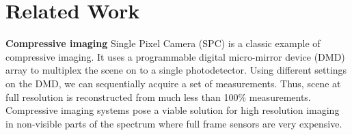 \documentclass[journal,twoside]{IEEEtran}
\begin{document}
\section{Related Work}





\textbf{Compressive imaging} Single Pixel Camera (SPC) \cite{duarte2008single} is a classic example of compressive imaging. It uses a programmable digital micro-mirror device (DMD) array to multiplex the scene on to a single photodetector. Using different settings on the DMD, we can sequentially acquire a set of measurements. Thus, scene at full resolution is reconstructed from much less than 100\% measurements. Compressive imaging systems pose a viable solution for high resolution imaging in non-visible parts of the spectrum where full frame sensors are very expensive. 
\end{document}
